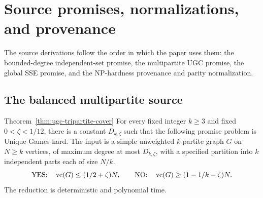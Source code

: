 \section{Source promises, normalizations, and provenance}
\label{sec:source-normalizations}

The source derivations follow the order in which the paper uses them:
the bounded-degree independent-set promise, the multipartite UGC
promise, the global SSE promise, and the NP-hardness provenance
and parity normalization.



\subsection{The balanced multipartite source}
\label{app:multipartite-normalization}

\begin{restatedtheorem}{Theorem~\ref{thm:ugc-tripartite-cover}}
For every fixed integer $k\geq3$ and fixed
$0<\zeta<1/12$, there is a constant $D_{k,\zeta}$ such that the
following promise problem is Unique Games-hard. The input is a
simple unweighted $k$-partite graph $G$ on $N\geq k$ vertices, of maximum
degree at most $D_{k,\zeta}$,
with a specified partition into $k$ independent parts each of size
$N/k$.
\[
 \textup{YES:}\quad\operatorname{vc}(G)\leq(1/2+\zeta)N,
 \qquad
 \textup{NO:}\quad\operatorname{vc}(G)\geq(1-1/k-\zeta)N.
\]
The reduction is deterministic and polynomial time.
\end{restatedtheorem}

